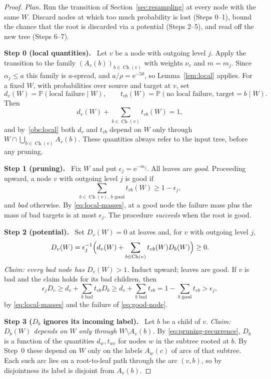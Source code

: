 \documentclass[11pt]{article}
\numberwithin{equation}{section}
\newcommand{\PP}{\mathbb P}
\newcommand{\ch}{\operatorname{Ch}}
\newcommand{\ee}{\mathrm e}
\newcommand{\step}[1]{\par\smallskip\noindent\textbf{Step #1.}\ }
\begin{document}
\begin{proof}
\emph{Plan.} Run the transition of Section~\ref{sec:resampling} at every
node with the same $W$. Discard nodes at which too much probability is
lost (Steps 0--1), bound the chance that the root is discarded via a
potential (Steps 2--5), and read off the new tree (Steps 6--7).

\step{0 (local quantities)} Let $v$ be a node with outgoing level $j$.
Apply the transition to the family $(A_v(b))_{b\in\ch(v)}$ with weights
$\nu_v$ and $m=m_j$. Since $\alpha_j\le a$ this family is $a$-spread, and
$a/\rho=\ee^{-50}$, so Lemma~\ref{lem:local} applies. For a fixed $W$,
with probabilities over source and target at $v$, set
\[
 d_v(W)=\PP(\text{local failure}\mid W),\qquad
 t_{vb}(W)=\PP(\text{no local failure, target}=b\mid W).
\]
Then
\begin{equation}\label{eq:local-masses}
 d_v(W)+\sum_{b\in\ch(v)}t_{vb}(W)=1,
\end{equation}
and by~\ref{obs:local} both $d_v$ and $t_{vb}$ depend on $W$ only through
$W\cap\bigcup_{b\in\ch(v)}A_v(b)$. These quantities always refer to the
input tree, before any pruning.

\step{1 (pruning)} Fix $W$ and put $\epsilon_j=\ee^{-m_j}$. All leaves
are \emph{good}. Proceeding upward, a node $v$ with outgoing level $j$ is
good if
\begin{equation}\label{eq:good-node}
 \sum_{b\in\ch(v),\ b\text{ good}}t_{vb}(W)\ge1-\epsilon_j,
\end{equation}
and \emph{bad} otherwise. By \eqref{eq:local-masses}, at a good node the
failure mass plus the mass of bad targets is at most $\epsilon_j$. The
procedure \emph{succeeds} when the root is good.

\step{2 (potential)} Set $D_v(W)=0$ at leaves and, for $v$ with outgoing
level $j$,
\begin{equation}\label{eq:pruning-recurrence}
 D_v(W)=\epsilon_j^{-1}
 \Bigl(d_v(W)+\sum_{b\in\ch(v)}t_{vb}(W)D_b(W)\Bigr)\ge0.
\end{equation}
\emph{Claim: every bad node has $D_v(W)>1$.} Induct upward; leaves are
good. If $v$ is bad and the claim holds for its bad children, then
\[
 \epsilon_jD_v\ge d_v+\sum_{b\text{ bad}}t_{vb}D_b
 \ge d_v+\sum_{b\text{ bad}}t_{vb}
 =1-\sum_{b\text{ good}}t_{vb}>\epsilon_j,
\]
by \eqref{eq:local-masses} and the failure of \eqref{eq:good-node}.

\step{3 ($D_b$ ignores its incoming label)} Let $b$ be a child of $v$.
\emph{Claim: $D_b(W)$ depends on $W$ only through $W\setminus A_v(b)$.}
By \eqref{eq:pruning-recurrence}, $D_b$ is a function of the quantities
$d_w,t_{wc}$ for nodes $w$ in the subtree rooted at $b$. By Step~0 these
depend on $W$ only on the labels $A_w(c)$ of arcs of that subtree. Each
such arc lies on a root-to-leaf path through the arc $(v,b)$, so by
disjointness its label is disjoint from $A_v(b)$.


\end{proof}
\end{document}
